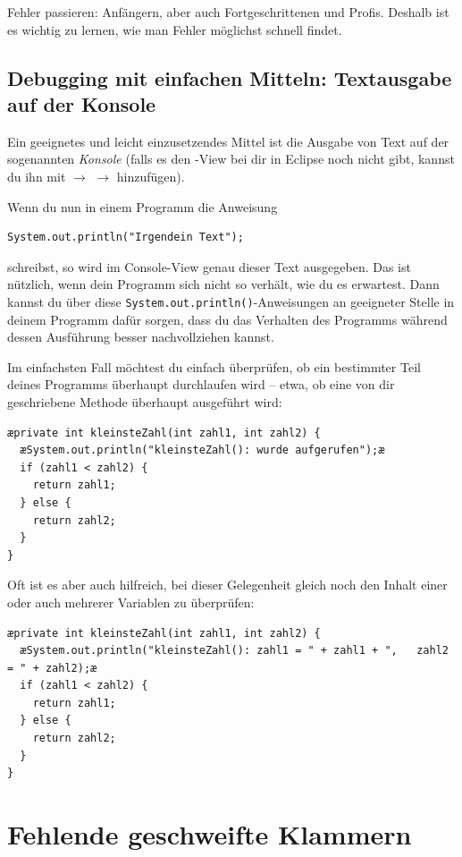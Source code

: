 Fehler passieren: Anfängern, aber auch Fortgeschrittenen und Profis.
Deshalb ist es wichtig zu lernen, wie man Fehler möglichst schnell findet.

\subsection{Debugging mit einfachen Mitteln: Textausgabe auf der Konsole}

Ein geeignetes und leicht einzusetzendes Mittel ist die Ausgabe von Text auf der
sogenannten \emph{Konsole} (falls es den -View bei dir in Eclipse
noch nicht gibt, kannst du ihn mit  $\rightarrow$  $\rightarrow$  hinzufügen).

Wenn du nun in einem Programm die Anweisung

\begin{lstlisting}
System.out.println("Irgendein Text");
\end{lstlisting}

schreibst, so wird im Console-View genau dieser Text ausgegeben. Das ist
nützlich, wenn dein Programm sich nicht so verhält, wie du es erwartest. Dann
kannst du über diese \lstinline|System.out.println()|-Anweisungen an geeigneter
Stelle in deinem Programm dafür sorgen, dass du das Verhalten des Programms
während dessen Ausführung besser nachvollziehen kannst.

Im einfachsten Fall möchtest du einfach überprüfen, ob ein bestimmter Teil
deines Programms überhaupt durchlaufen wird -- etwa, ob eine von dir geschriebene
Methode überhaupt ausgeführt wird:

\begin{lstlisting}
æprivate int kleinsteZahl(int zahl1, int zahl2) {
  æSystem.out.println("kleinsteZahl(): wurde aufgerufen");æ
  if (zahl1 < zahl2) {
    return zahl1;
  } else {
    return zahl2;
  }
}
\end{lstlisting}

Oft ist es aber auch hilfreich, bei dieser Gelegenheit gleich noch den
Inhalt einer oder auch mehrerer Variablen zu überprüfen:

\begin{lstlisting}
æprivate int kleinsteZahl(int zahl1, int zahl2) {
  æSystem.out.println("kleinsteZahl(): zahl1 = " + zahl1 + ",   zahl2 = " + zahl2);æ
  if (zahl1 < zahl2) {
    return zahl1;
  } else {
    return zahl2;
  }
}
\end{lstlisting}


\section{Fehlende geschweifte Klammern}

